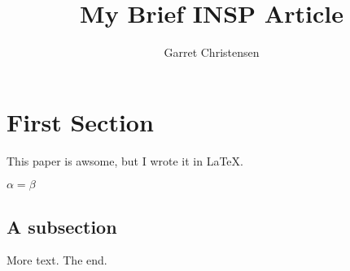 \documentclass[11pt]{article} %
\title{My Brief INSP Article}
\author{Garret Christensen}
\begin{document}
\maketitle

\section{First Section}

This paper is awsome, but I wrote it in \LaTeX.

$\alpha=\beta$

\subsection{A subsection}

More text. The end.
\end{document}
